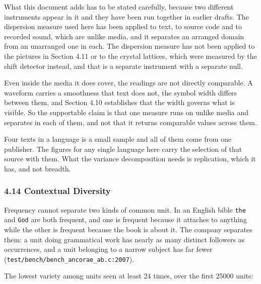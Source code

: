 What this document adds has to be stated carefully, because two different instruments appear in it and they have been run together in earlier drafts. The dispersion measure used here has been applied to text, to source code and to recorded sound, which are unlike media, and it separates an arranged domain from an unarranged one in each. The dispersion measure has not been applied to the pictures in Section 4.11 or to the crystal lattices, which were measured by the shift detector instead, and that is a separate instrument with a separate null.

Even inside the media it does cover, the readings are not directly comparable. A waveform carries a smoothness that text does not, the symbol width differs between them, and Section 4.10 establishes that the width governs what is visible. So the supportable claim is that one measure runs on unlike media and separates in each of them, and not that it returns comparable values across them.

Four texts in a language is a small sample and all of them come from one publisher. The figures for any single language here carry the selection of that source with them. What the variance decomposition needs is replication, which it has, and not breadth.

\subsubsection{4.14 Contextual Diversity}

Frequency cannot separate two kinds of common unit. In an English bible \texttt{the} and \texttt{God} are both frequent, and one is frequent because it attaches to anything while the other is frequent because the book is about it. The company separates them: a unit doing grammatical work has nearly as many distinct followers as occurrences, and a unit belonging to a narrow subject has far fewer (\texttt{test/\allowbreak{}bench/\allowbreak{}bench\_\allowbreak{}ancorae\_\allowbreak{}ab.\allowbreak{}c:2007}).

The lowest variety among units seen at least 24 times, over the first 25000 units:


